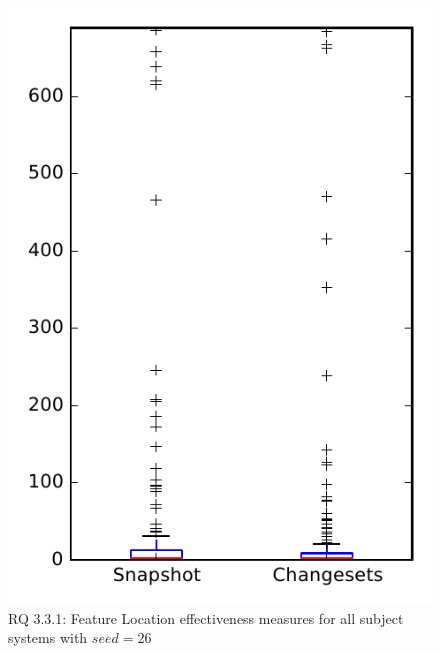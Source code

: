 
\begin{figure}
\centering
\includegraphics[height=0.4\textheight]{figures/flt_seed/rq1_overview_26}
\caption{RQ 3.3.1: Feature Location effectiveness measures for all subject systems with $seed=26$}
\label{fig:flt_seed:rq1:overview}
\end{figure}
